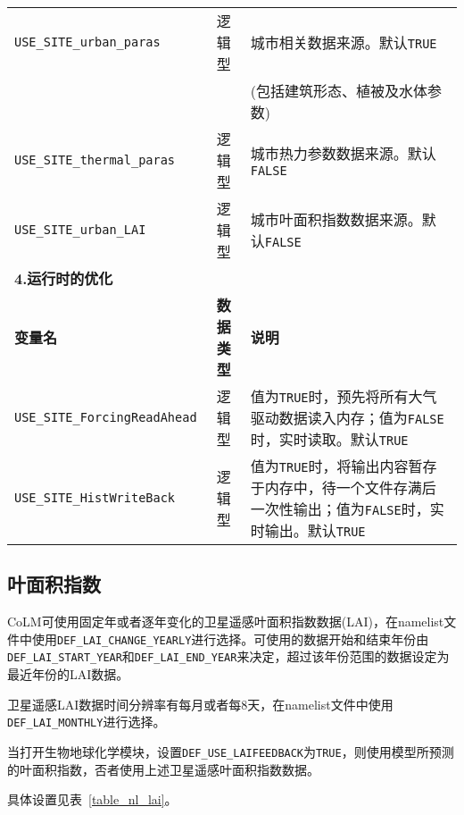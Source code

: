 \begin{table}[!htbp]
\begin{tabular}{lcp{}}
\texttt{USE\_SITE\_urban\_paras} & 逻辑型 & 城市相关数据来源。默认\texttt{TRUE} \\
& &(包括建筑形态、植被及水体参数) \\
\texttt{USE\_SITE\_thermal\_paras} & 逻辑型 & 城市热力参数数据来源。默认\texttt{FALSE} \\
\texttt{USE\_SITE\_urban\_LAI} & 逻辑型 & 城市叶面积指数数据来源。默认\texttt{FALSE} \\
\midrule
\textbf{4.运行时的优化} & & \\
\textbf{变量名} & \textbf{数据类型} & \textbf{说明} \\
\texttt{USE\_SITE\_ForcingReadAhead} & 逻辑型 & 值为\texttt{TRUE}时，预先将所有大气驱动数据读入内存；值为\texttt{FALSE}时，实时读取。默认\texttt{TRUE} \\
\texttt{USE\_SITE\_HistWriteBack} & 逻辑型 & 值为\texttt{TRUE}时，将输出内容暂存于内存中，待一个文件存满后一次性输出；值为\texttt{FALSE}时，实时输出。默认\texttt{TRUE} \\
\bottomrule
\end{tabular}
\end{table}


\subsection{叶面积指数} \label{subsection_lai}

CoLM可使用固定年或者逐年变化的卫星遥感叶面积指数数据(LAI)，在namelist文件中使用\texttt{DEF\_LAI\_CHANGE\_YEARLY}进行选择。可使用的数据开始和结束年份由\texttt{DEF\allowbreak\_LAI\allowbreak\_START\allowbreak\_YEAR}和\texttt{DEF\_LAI\_END\_YEAR}来决定，超过该年份范围的数据设定为最近年份的LAI数据。

卫星遥感LAI数据时间分辨率有每月或者每8天，在namelist文件中使用\texttt{DEF\allowbreak\_LAI\allowbreak\_MONTHLY}进行选择。

当打开生物地球化学模块，设置\texttt{DEF\_USE\_LAIFEEDBACK}为\texttt{TRUE}，则使用模型所预测的叶面积指数，否者使用上述卫星遥感叶面积指数数据。

具体设置见表~\ref{table_nl_lai}。

